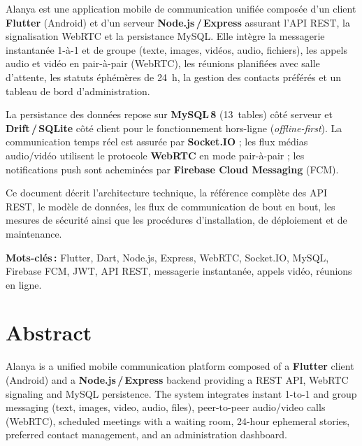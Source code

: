 \documentclass[11pt,a4paper,oneside]{report}
\begin{document}
Alanya est une application mobile de communication unifi\'{e}e compos\'{e}e d'un client
\textbf{Flutter} (Android) et d'un serveur \textbf{Node.js\,/\,Express} assurant l'API REST,
la signalisation WebRTC et la persistance MySQL\@.
Elle int\`{e}gre la messagerie instantan\'{e}e 1-\`{a}-1 et de groupe (texte, images,
vid\'{e}os, audio, fichiers), les appels audio et vid\'{e}o en pair-\`{a}-pair (WebRTC),
les r\'{e}unions planifi\'{e}es avec salle d'attente, les statuts \'{e}ph\'{e}m\`{e}res de 24~h,
la gestion des contacts pr\'{e}f\'{e}r\'{e}s et un tableau de bord d'administration.

La persistance des donn\'{e}es repose sur \textbf{MySQL\,8} (13~tables) c\^{o}t\'{e} serveur
et \textbf{Drift\,/\,SQLite} c\^{o}t\'{e} client pour le fonctionnement hors-ligne
(\emph{offline-first}).
La communication temps r\'{e}el est assur\'{e}e par \textbf{Socket.IO} ; les flux m\'{e}dias
audio/vid\'{e}o utilisent le protocole \textbf{WebRTC} en mode pair-\`{a}-pair ;
les notifications push sont achemin\'{e}es par \textbf{Firebase Cloud Messaging} (FCM).

Ce document d\'{e}crit l'architecture technique, la r\'{e}f\'{e}rence compl\`{e}te des API REST,
le mod\`{e}le de donn\'{e}es, les flux de communication de bout en bout, les mesures de
s\'{e}curit\'{e} ainsi que les proc\'{e}dures d'installation, de d\'{e}ploiement et de maintenance.

\vspace{0.8cm}
\noindent\textbf{Mots-cl\'{e}s\,:} Flutter, Dart, Node.js, Express, WebRTC, Socket.IO,
MySQL, Firebase FCM, JWT, API REST, messagerie instantan\'{e}e, appels vid\'{e}o,
r\'{e}unions en ligne.

\chapter*{Abstract}
\thispagestyle{plain}

Alanya is a unified mobile communication platform composed of a \textbf{Flutter}
client (Android) and a \textbf{Node.js\,/\,Express} backend providing a REST API,
WebRTC signaling and MySQL persistence.
The system integrates instant 1-to-1 and group messaging (text, images, video,
audio, files), peer-to-peer audio/video calls (WebRTC), scheduled meetings with
a waiting room, 24-hour ephemeral stories, preferred contact management, and an
administration dashboard.
\end{document}
